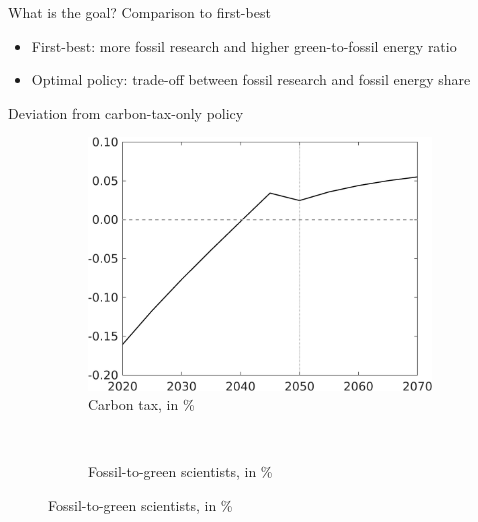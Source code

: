 \documentclass[11pt,aspectratio=169]{beamer}
\begin{document}
\begin{frame}{What is the goal? Comparison to first-best}
\begin{figure}[h!!]
\end{figure}
\pause
\vspace{3mm}
\begin{block}{}
	\begin{itemize}
		\item<+-> First-best: more fossil research and higher green-to-fossil energy ratio
		\item<+-> Optimal policy: trade-off between fossil research and fossil energy share
	\end{itemize}
\end{block}	
\end{frame}

\begin{frame}{Deviation from carbon-tax-only policy}
\pause
\centering
\begin{figure}
	\begin{subfigure}{0.4\textwidth}
		\caption{\normalsize{Carbon tax, in \%}}
		\includegraphics[width=1\textwidth]{../codding_model/own_basedOnFried/optimalPol_010922_revision/figures/all_13Sept22_Tplus30/Tauf_OPT_T_NoTaus_COMPtaulPer_regime4_spillover0_knspil0_noskill0_sep0_xgrowth0_PV1_etaa0.79.png}
	\end{subfigure}
	\begin{minipage}[]{0.1\textwidth}
		\
	\end{minipage}
	\begin{subfigure}{0.4\textwidth}
		\caption{\normalsize{Fossil-to-green scientists,  in \% }}

\end{subfigure}
\end{figure}
\end{frame}
\end{document}
